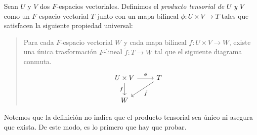 \begin{definition}
  Sean $U$ y $V$ dos $F$-espacios vectoriales. Definimos el \emph{producto tensorial de $U$ y $V$} como un $F$-espacio vectorial $T$ junto con un mapa bilineal $\phi\colon U \times V \to T$ tales que satisfacen la siguiente propiedad universal:
  \begin{quote}
    Para cada $F$-espacio vectorial $W$ y cada mapa bilineal $f\colon U \times V \to W$, existe una única trasformación $F$-lineal $\tilde f \colon T \to W$ tal que el siguiente diagrama conmuta.
      \[
        \begin{tikzcd}
          U \times V \arrow[r, "\phi"] \arrow[d, "f"'] & T \arrow[ld, "\tilde f"] \\
          W                                            &                         
        \end{tikzcd}
      \]
  \end{quote}
\end{definition}

Notemos que la definición no indica que el producto tensorial sea único ni asegura que exista. De este modo, es lo primero que hay que probar.

